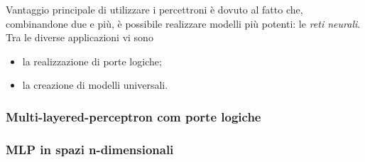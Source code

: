 \documentclass{subfiles}
\begin{document}
Vantaggio principale di utilizzare i percettroni è dovuto al fatto che, combinandone due e più,
è possibile realizzare modelli più potenti: le \emph{reti neurali}.
Tra le diverse applicazioni vi sono
\begin{itemize}
    \item la realizzazione di porte logiche;
    \item la creazione di modelli universali.
\end{itemize}

\clearpage
\subsubsection{Multi-layered-perceptron com porte logiche}


\subsubsection{MLP in spazi n-dimensionali}

\end{document}
